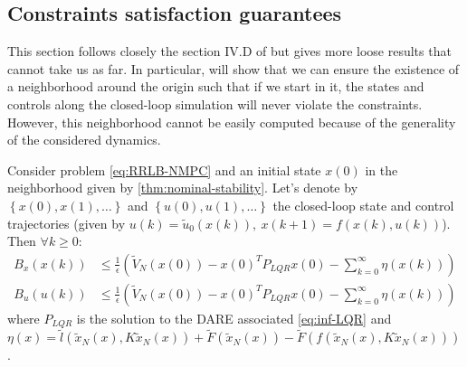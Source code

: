 \documentclass[12pt]{article}
\begin{document}
\subsection{Constraints satisfaction guarantees}\label{sec:constraints-satisfaction-guarantees}
This section follows closely the section IV.D of \cite{RRLB-linear-MPC} but gives more loose results that cannot take us as far.
In particular, will show that we can ensure the existence of a neighborhood around the origin such that if we start in it, the states and controls along the closed-loop simulation will never violate the constraints.
However, this neighborhood cannot be easily computed because of the generality of the considered dynamics.


\begin{lemma}
	\label{thm:RRLB-bounds-guarantees}
	Consider problem \ref{eq:RRLB-NMPC} and an initial state $x(0)$ in the neighborhood given by \ref{thm:nominal-stability}.
	Let's denote by $\left\{x(0),x(1),\dots\right\}$ and $\left\{u(0), u(1),\dots\right\}$ the closed-loop state and control trajectories (given by $u(k)=\tilde{u}_0(x(k)),~x(k+1)=f(x(k),u(k))$).
	Then $\forall k\geq 0$:
	\begin{align*}
		B_x(x(k))&\leq\frac{1}{\epsilon}\left(\tilde{V}_N(x(0))-x(0)^TP_{LQR}x(0)-\sum_{k=0}^\infty\eta(x(k))\right)\\
		B_u(u(k))&\leq\frac{1}{\epsilon}\left(\tilde{V}_N(x(0))-x(0)^TP_{LQR}x(0)-\sum_{k=0}^\infty\eta(x(k))\right)
	\end{align*}
	where $P_{LQR}$ is the solution to the DARE associated \ref{eq:inf-LQR} and $\eta(x)=\tilde{l}(\tilde{x}_N(x),K\tilde{x}_N(x))+\tilde{F}(\tilde{x}_N(x))-\tilde{F}(f(\tilde{x}_N(x), K\tilde{x}_N(x)))$.
\end{lemma}
\end{document}
